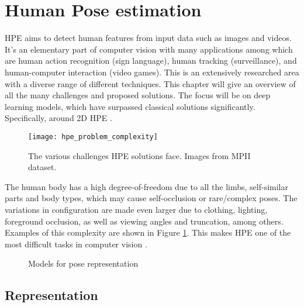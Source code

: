 \section{Human Pose estimation}
\label{sec:hpe}
HPE aims to detect human features from input data such as images and videos.
It's an elementary part of computer vision with many applications among which are human action recognition (sign language), human tracking (surveillance), and human-computer interaction (video games).
This is an extensively researched area with a diverse range of different techniques.
This chapter will give an overview of all the many challenges and proposed solutions.
The focus will be on deep learning models, which have surpassed classical solutions significantly.
Specifically, around 2D HPE \cite{Munea2020, Zheng2012, Liu2104, chen2022}.

\begin{figure}[h]
	\centering
	\texttt{[image: hpe\_problem\_complexity]}
	\caption{The various challenges HPE solutions face. Images from \gls{MPII} dataset. \cite{Andriluka2014, Chen2000}}
	\label{fig:hpe_problem_complexity}
\end{figure}

The human body has a high degree-of-freedom due to all the limbs, self-similar parts and body types, which may cause self-occlusion or rare/complex poses.
The variations in configuration are made even larger due to clothing, lighting, foreground occlusion, as well as viewing angles and truncation, among others.
Examples of this complexity are shown in Figure \ref{fig:hpe_problem_complexity}.
This makes HPE one of the most difficult tasks in computer vision \cite{jain2014, Chen2000}.

\begin{figure}[t]
	\centering
	\caption{Models for pose representation \cite{Zheng2012}}
	\label{fig:pose_representation}
\end{figure}
\subsection{Representation}
\label{section:representation}

